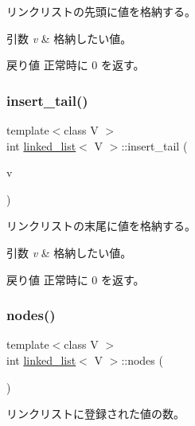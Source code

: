 リンクリストの先頭に値を格納する。 
\begin{DoxyParams}{引数}
{\em v} & 格納したい値。 \\
\hline
\end{DoxyParams}
\begin{DoxyReturn}{戻り値}
正常時に 0 を返す。 
\end{DoxyReturn}
\hypertarget{classlinked__list_a97ae2482ebf484475b017dfd104b4860}{}\label{classlinked__list_a97ae2482ebf484475b017dfd104b4860} 
\subsubsection{\texorpdfstring{insert\+\_\+tail()}{insert\_tail()}}
{\footnotesize\ttfamily template$<$class V $>$ \\
int \hyperlink{classlinked__list}{linked\+\_\+list}$<$ V $>$\+::insert\+\_\+tail (\begin{DoxyParamCaption}\item[{V \&}]{v }\end{DoxyParamCaption})}

リンクリストの末尾に値を格納する。 
\begin{DoxyParams}{引数}
{\em v} & 格納したい値。 \\
\hline
\end{DoxyParams}
\begin{DoxyReturn}{戻り値}
正常時に 0 を返す。 
\end{DoxyReturn}
\hypertarget{classlinked__list_aa79d43937baecb85adc0731c3c078129}{}\label{classlinked__list_aa79d43937baecb85adc0731c3c078129} 
\subsubsection{\texorpdfstring{nodes()}{nodes()}}
{\footnotesize\ttfamily template$<$class V $>$ \\
int \hyperlink{classlinked__list}{linked\+\_\+list}$<$ V $>$\+::nodes (\begin{DoxyParamCaption}{ }\end{DoxyParamCaption})}

リンクリストに登録された値の数。 \hypertarget{classlinked__list_a32097a2dcd6f5f0f20c9b3e29a3f631e}{}\label{classlinked__list_a32097a2dcd6f5f0f20c9b3e29a3f631e} 
